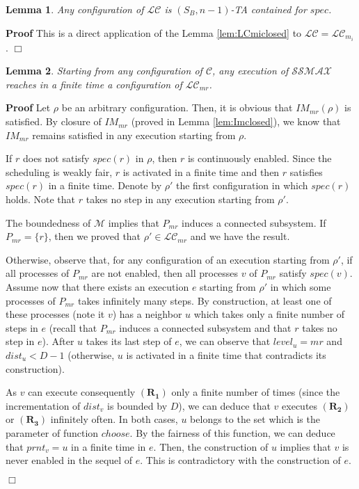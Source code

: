 \documentclass[11pt]{article}
\newenvironment{proof}{\noindent\textbf{Proof}}{\hfill\qed}
\newcommand{\qed}{\hfill$\Box$}
\newtheorem{lem}{Lemma}
\newenvironment{lemma}[1]{\vspace{-0.25cm}\begin{lem}#1}{\end{lem}\vspace{-0.3cm}}
\begin{document}
\begin{lemma}\label{lem:SBTAcontainedMax}
Any configuration of $\mathcal{LC}$ is $(S_B,n-1)$-TA contained for $spec$.
\end{lemma}

\begin{proof}
This is a direct application of the Lemma \ref{lem:LCmiclosed} to $\mathcal{LC}=\mathcal{LC}_{m_i}$.
\end{proof}

\begin{lemma}\label{lem:CtoLCmr}
Starting from any configuration of $\mathcal{C}$, any execution of $\mathcal{SSMAX}$ reaches in a finite time a configuration of $\mathcal{LC}_{mr}$.
\end{lemma}

\begin{proof}
Let $\rho$ be an arbitrary configuration. Then, it is obvious that $IM_{mr}(\rho)$ is satisfied. By closure of $IM_{mr}$ (proved in Lemma \ref{lem:Imclosed}), we know that $IM_{mr}$ remains satisfied in any execution starting from $\rho$.

If $r$ does not satisfy $spec(r)$ in $\rho$, then $r$ is continuously enabled. Since the scheduling is weakly fair, $r$ is activated in a finite time and then $r$ satisfies $spec(r)$ in a finite time. Denote by $\rho'$ the first configuration in which $spec(r)$ holds. Note that $r$ takes no step in any execution starting from $\rho'$.

The boundedness of $\mathcal{M}$ implies that $P_{mr}$ induces a connected subsystem. If $P_{mr}=\{r\}$, then we proved that $\rho'\in\mathcal{LC}_{mr}$ and we have the result.

Otherwise, observe that, for any configuration of an execution starting from $\rho'$, if all processes of $P_{mr}$ are not enabled, then all processes $v$ of $P_{mr}$ satisfy $spec(v)$. Assume now that there exists an execution $e$ starting from $\rho'$ in which some processes of $P_{mr}$ takes infinitely many steps. By construction, at least one of these processes (note it $v$) has a neighbor $u$ which takes only a finite number of steps in $e$ (recall that $P_{mr}$ induces a connected subsystem and that $r$ takes no step in $e$). After $u$ takes its last step of $e$, we can observe that $level_u=mr$ and $dist_u<D-1$ (otherwise, $u$ is activated in a finite time that contradicts its construction). 

As $v$ can execute consequently $\boldsymbol{(R_1)}$ only a finite number of times (since the incrementation of $dist_v$ is bounded by $D$), we can deduce that $v$ executes $\boldsymbol{(R_2)}$ or $\boldsymbol{(R_3)}$ infinitely often. In both cases, $u$ belongs to the set which is the parameter of function $choose$. By the fairness of this function, we can deduce that $prnt_v=u$ in a finite time in $e$. Then, the construction of $u$ implies that $v$ is never enabled in the sequel of $e$. This is contradictory with the construction of $e$.


\end{proof}
\end{document}
